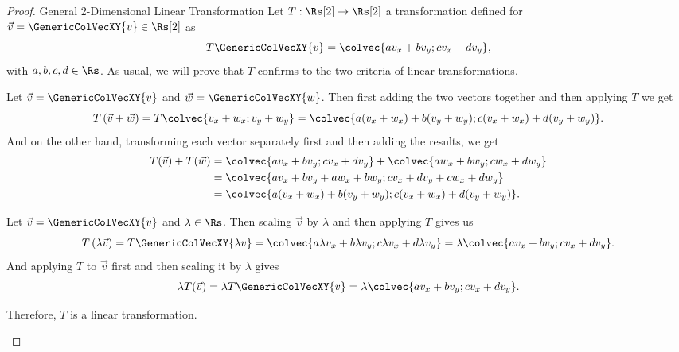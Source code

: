 \begin{proof}{General 2-Dimensional Linear Transformation}{}
	Let $T:\Rs[2]\to\Rs[2]$ a transformation defined for $\vec{v}=\GenericColVecXY{v}\in\Rs[2]$ as
	\begin{equation*}
		T\GenericColVecXY{v} = \colvec{av_{x}+bv_{y};cv_{x}+dv_{y}},
	\end{equation*}
	with $a,b,c,d\in\Rs$. As usual, we will prove that $T$ confirms to the two criteria of linear transformations.

	\begin{descitemize}
		\item[Additivity] Let $\vec{v}=\GenericColVecXY{v}$ and $\vec{w}=\GenericColVecXY{w}$. Then first adding the two vectors together and then applying $T$ we get
			\begin{equation*}
				T\left(\vec{v}+\vec{w}\right) = T\colvec{v_{x}+w_{x};v_{y}+w_{y}} = \colvec{a(v_{x}+w_{x})+b(v_{y}+w_{y});c(v_{x}+w_{x})+d(v_{y}+w_{y})}. 
			\end{equation*}
		And on the other hand, transforming each vector separately first and then adding the results, we get
		\begin{align*}
			T(\vec{v}) + T(\vec{w}) &= \colvec{av_{x}+bv_{y};cv_{x}+dv_{y}} + \colvec{aw_{x}+bw_{y};cw_{x}+dw_{y}}\\
									&= \colvec{av_{x}+bv_{y}+aw_{x}+bw_{y};cv_{x}+dv_{y}+cw_{x}+dw_{y}}\\
									&=\colvec{a(v_{x}+w_{x})+b(v_{y}+w_{y});c(v_{x}+w_{x})+d(v_{y}+w_{y})}. 
		\end{align*}

		\item[Homogeneity] Let $\vec{v}=\GenericColVecXY{v}$ and $\lambda\in\Rs$. Then scaling $\vec{v}$ by $\lambda$ and then applying $T$ gives us
			\begin{equation*}
				T\left(\lambda\vec{v}\right) = T\GenericColVecXY{\lambda v} = \colvec{a\lambda v_{x}+b\lambda v_{y};c\lambda v_{x}+d\lambda v_{y}} = \lambda\colvec{av_{x}+bv_{y};cv_{x}+dv_{y}}.
			\end{equation*}
			And applying $T$ to $\vec{v}$ first and then scaling it by $\lambda$ gives
			\begin{equation*}
				\lambda T(\vec{v}) = \lambda T\GenericColVecXY{v} = \lambda\colvec{av_{x}+bv_{y};cv_{x}+dv_{y}}.
			\end{equation*}

		Therefore, $T$ is a linear transformation.
	\end{descitemize}
\end{proof}

